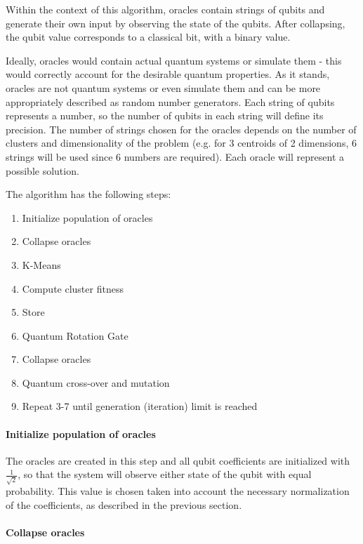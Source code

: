 Within the context of this algorithm, oracles contain strings of qubits and generate their own input by observing the state of the qubits.
After collapsing, the qubit value corresponds to a classical bit, with a binary value.

Ideally, oracles would contain actual quantum systems or simulate them - this would correctly account for the desirable quantum properties.
As it stands, oracles are not quantum systems or even simulate them and can be more appropriately described as random number generators.
Each string of qubits represents a number, so the number of qubits in each string will define its precision.
The number of strings chosen for the oracles depends on the number of clusters and dimensionality of the problem (e.g. for 3 centroids of 2 dimensions, 6 strings will be used since 6 numbers are required).
Each oracle will represent a possible solution.

The algorithm has the following steps:
\begin{enumerate}
\item Initialize population of oracles
\item Collapse oracles
\item K-Means
\item Compute cluster fitness
\item Store
\item Quantum Rotation Gate
\item Collapse oracles
\item Quantum cross-over and mutation
\item Repeat 3-7 until generation (iteration) limit is reached
\end{enumerate}


\paragraph{Initialize population of oracles}

The oracles are created in this step and all qubit coefficients are initialized with $\frac{1}{\sqrt{2}}$, so that the system will observe either state of the qubit with equal probability.
This value is chosen taken into account the necessary normalization of the coefficients, as described in the previous section.

\paragraph{Collapse oracles}

